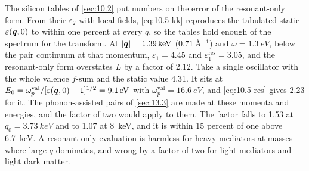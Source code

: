 The silicon tables of \cref{sec:10.2} put numbers on the error of the resonant-only form. From their $\varepsilon_2$ with local fields, \cref{eq:10.5-kk} reproduces the tabulated static $\varepsilon(\bm{q},0)$ to within one percent at every $q$, so the tables hold enough of the spectrum for the transform. At $|\bm{q}| = \SI{1.39}{keV}$ ($\SI{0.71}{\angstrom^{-1}}$) and $\omega = \SI{1.3}{eV}$, below the pair continuum at that momentum, $\varepsilon_1 = 4.45$ and $\varepsilon_1^{\mathrm{res}} = 3.05$, and the resonant-only form overstates $L$ by a factor of 2.12. Take a single oscillator with the whole valence $f$-sum and the static value 4.31. It sits at $E_0 = \omega_p^{\mathrm{val}}/[\varepsilon(\bm{q},0) - 1]^{1/2} = \SI{9.1}{eV}$ with $\omega_p^{\mathrm{val}} = \SI{16.6}{eV}$, and \cref{eq:10.5-res} gives 2.23 for it. The phonon-assisted pairs of \cref{sec:13.3} are made at these momenta and energies, and the factor of two would apply to them. The factor falls to 1.53 at $q_0 = \SI{3.73}{keV}$ and to 1.07 at \SI{8}{keV}, and it is within 15 percent of one above \SI{6.7}{keV}. A resonant-only evaluation is harmless for heavy mediators at masses where large $q$ dominates, and wrong by a factor of two for light mediators and light dark matter.

